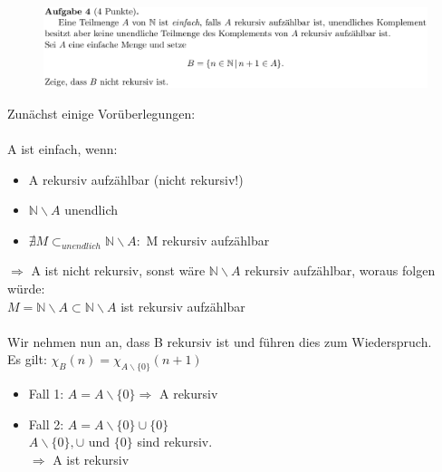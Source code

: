 \documentclass[a4paper]{scrartcl}%
\begin{document}
\section*{}%
\label{sec:aufgabe_4}

    \begin{figure}[H]
        \includegraphics[scale=0.3]{./A-4.png}
        \label{fig:}
    \end{figure}

    Zunächst einige Vorüberlegungen:\\
    \\A ist einfach, wenn:\\
    \begin{itemize}
        \item A rekursiv aufzählbar (nicht rekursiv!)\\
        \item $ \mathds{N}\backslash A$ unendlich\\
        \item $\nexists M \subset_{unendlich} \mathds{N} \backslash A:$ M rekursiv aufzählbar\\
    \end{itemize}
    $\Rightarrow$ A ist nicht rekursiv, sonst wäre $ \mathds{N} \backslash A$ rekursiv aufzählbar, woraus folgen würde:\\
    $M = \mathds{N} \backslash A \subset \mathds{N} \backslash A$ ist rekursiv aufzählbar \lightning\\
    \\Wir nehmen nun an, dass B rekursiv ist und führen dies zum Wiederspruch.\\
    Es gilt: $\chi_B(n) = \chi_{A\backslash \{0\}}(n+1)$\\

    \begin{itemize}
        \item Fall 1: $A = A \backslash \{0\} \Rightarrow$ A rekursiv \lightning\\
        \item Fall 2: $A = A \backslash \{0\} \cup  \{0\}$\\
            $A \backslash \{0\}, \cup \text{ und } \{0\}$ sind rekursiv.\\
            $\Rightarrow$ A ist rekursiv \lightning\\
    \end{itemize}%
\end{document}
